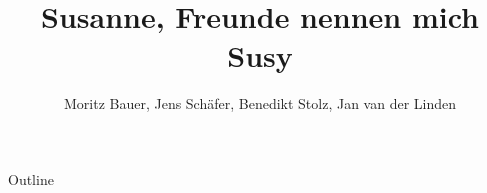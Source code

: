\documentclass[18pt]{beamer}
\title[SUSY]{Susanne, Freunde nennen mich Susy}
\author{Moritz Bauer, Jens Schäfer, Benedikt Stolz, Jan van der Linden}
\institute{Institut für Experimentelle Teilchenphysik (ETP)}
\begin{document}

\begin{frame}
\titlepage
\end{frame}


\begin{frame}{Outline}
\tableofcontents
\end{frame}





\end{document}
